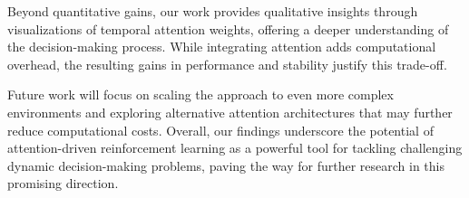 \documentclass{article}
\begin{document}
Beyond quantitative gains, our work provides qualitative insights through visualizations of temporal attention weights, offering a deeper understanding of the decision-making process. While integrating attention adds computational overhead, the resulting gains in performance and stability justify this trade-off.

Future work will focus on scaling the approach to even more complex environments and exploring alternative attention architectures that may further reduce computational costs. Overall, our findings underscore the potential of attention-driven reinforcement learning as a powerful tool for tackling challenging dynamic decision-making problems, paving the way for further research in this promising direction.




\end{document}
